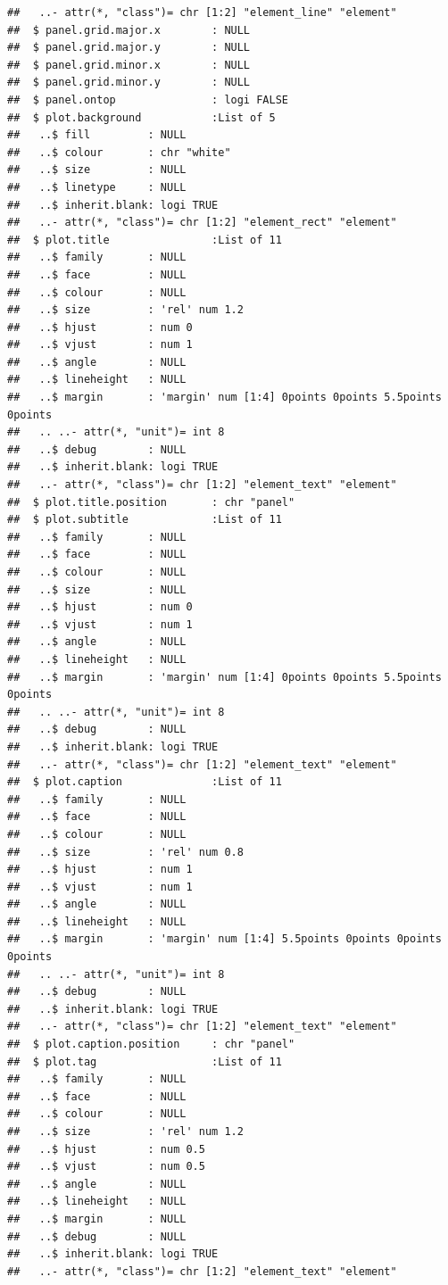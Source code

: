 \documentclass{article}\usepackage[]{graphicx}\usepackage[]{color}
\makeatletter
\newenvironment{kframe}{%
 \def\at@end@of@kframe{}%
 \ifinner\ifhmode%
  \def\at@end@of@kframe{\end{minipage}}%
  \begin{minipage}{\columnwidth}%
 \fi\fi%
 \def\FrameCommand##1{\hskip\@totalleftmargin \hskip-\fboxsep
 \colorbox{shadecolor}{##1}\hskip-\fboxsep
     \hskip-\linewidth \hskip-\@totalleftmargin \hskip\columnwidth}%
 \MakeFramed {\advance\hsize-\width
   \@totalleftmargin\z@ \linewidth\hsize
   \@setminipage}}%
 {\par\unskip\endMakeFramed%
 \at@end@of@kframe}
\newenvironment{knitrout}{}{} %
\makeatother
\begin{document}
\begin{enumerate}
\begin{enumerate}
\begin{knitrout}
\begin{kframe}
\begin{verbatim}
##   ..- attr(*, "class")= chr [1:2] "element_line" "element"
##  $ panel.grid.major.x        : NULL
##  $ panel.grid.major.y        : NULL
##  $ panel.grid.minor.x        : NULL
##  $ panel.grid.minor.y        : NULL
##  $ panel.ontop               : logi FALSE
##  $ plot.background           :List of 5
##   ..$ fill         : NULL
##   ..$ colour       : chr "white"
##   ..$ size         : NULL
##   ..$ linetype     : NULL
##   ..$ inherit.blank: logi TRUE
##   ..- attr(*, "class")= chr [1:2] "element_rect" "element"
##  $ plot.title                :List of 11
##   ..$ family       : NULL
##   ..$ face         : NULL
##   ..$ colour       : NULL
##   ..$ size         : 'rel' num 1.2
##   ..$ hjust        : num 0
##   ..$ vjust        : num 1
##   ..$ angle        : NULL
##   ..$ lineheight   : NULL
##   ..$ margin       : 'margin' num [1:4] 0points 0points 5.5points 0points
##   .. ..- attr(*, "unit")= int 8
##   ..$ debug        : NULL
##   ..$ inherit.blank: logi TRUE
##   ..- attr(*, "class")= chr [1:2] "element_text" "element"
##  $ plot.title.position       : chr "panel"
##  $ plot.subtitle             :List of 11
##   ..$ family       : NULL
##   ..$ face         : NULL
##   ..$ colour       : NULL
##   ..$ size         : NULL
##   ..$ hjust        : num 0
##   ..$ vjust        : num 1
##   ..$ angle        : NULL
##   ..$ lineheight   : NULL
##   ..$ margin       : 'margin' num [1:4] 0points 0points 5.5points 0points
##   .. ..- attr(*, "unit")= int 8
##   ..$ debug        : NULL
##   ..$ inherit.blank: logi TRUE
##   ..- attr(*, "class")= chr [1:2] "element_text" "element"
##  $ plot.caption              :List of 11
##   ..$ family       : NULL
##   ..$ face         : NULL
##   ..$ colour       : NULL
##   ..$ size         : 'rel' num 0.8
##   ..$ hjust        : num 1
##   ..$ vjust        : num 1
##   ..$ angle        : NULL
##   ..$ lineheight   : NULL
##   ..$ margin       : 'margin' num [1:4] 5.5points 0points 0points 0points
##   .. ..- attr(*, "unit")= int 8
##   ..$ debug        : NULL
##   ..$ inherit.blank: logi TRUE
##   ..- attr(*, "class")= chr [1:2] "element_text" "element"
##  $ plot.caption.position     : chr "panel"
##  $ plot.tag                  :List of 11
##   ..$ family       : NULL
##   ..$ face         : NULL
##   ..$ colour       : NULL
##   ..$ size         : 'rel' num 1.2
##   ..$ hjust        : num 0.5
##   ..$ vjust        : num 0.5
##   ..$ angle        : NULL
##   ..$ lineheight   : NULL
##   ..$ margin       : NULL
##   ..$ debug        : NULL
##   ..$ inherit.blank: logi TRUE
##   ..- attr(*, "class")= chr [1:2] "element_text" "element"

\end{verbatim}
\end{kframe}
\end{knitrout}
\end{enumerate}
\end{enumerate}
\end{document}
